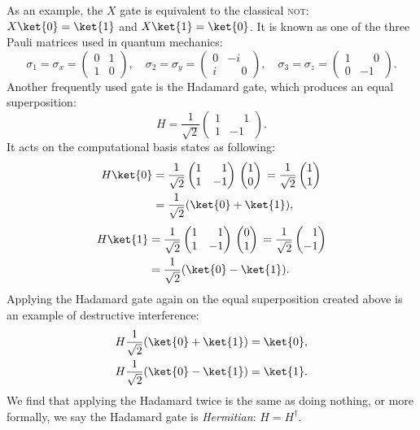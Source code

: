 \documentclass[a4paper,10pt]{article}
\newcommand{\qstatezero}{
	\begin{pmatrix}1 \\ 0\end{pmatrix}
}
\newcommand{\qstateone}{
	\begin{pmatrix}0 \\ 1\end{pmatrix}
}
\newcommand{\hgate}{
	\dfrac{1}{\sqrt2}
	\begin{pmatrix}
		1 & \phantom{-}1 \\
		1 & -1
	\end{pmatrix}
}
\begin{document}
As an example, the $X$ gate is equivalent to the classical \textsc{not}: $X\ket{0} = \ket{1}$ and $X\ket{1} = \ket{0}$.
It is known as one of the three Pauli matrices used in quantum mechanics:
\begin{equation}
\sigma_1 = \sigma_x =
\begin{pmatrix}
0 & 1 \\
1 & 0
\end{pmatrix},
\quad
\sigma_2 = \sigma_y =
\begin{pmatrix}
0 & -i \\
i & \phantom{-}0
\end{pmatrix},
\quad
\sigma_3 = \sigma_z =
\begin{pmatrix}
1 & \phantom{-}0 \\
0 & -1
\end{pmatrix}.
\end{equation}
Another frequently used gate is the Hadamard gate, which produces an equal superposition:
\begin{equation}
H = \hgate{}.
\end{equation}
It acts on the computational basis states as following:
\begin{equation}
\begin{aligned}
H\ket{0} &=
\hgate{}
\qstatezero{}
=
\dfrac{1}{\sqrt2}
\begin{pmatrix}1 \\ 1\end{pmatrix} \\
&= \dfrac{1}{\sqrt2}(\ket{0} + \ket{1}),
\end{aligned}
\end{equation}
\begin{equation}
\begin{aligned}
H\ket{1} &=
\hgate{}
\qstateone{}
=
\dfrac{1}{\sqrt2}
\begin{pmatrix}\phantom{-}1 \\ -1\end{pmatrix} \\
&= \dfrac{1}{\sqrt2}(\ket{0} - \ket{1}).
\end{aligned}
\end{equation}
Applying the Hadamard gate again on the equal superposition created above is an example of destructive interference:
\begin{equation}
\begin{aligned}
H\dfrac{1}{\sqrt2}(\ket{0} + \ket{1}) &= \ket{0}, \\
H\dfrac{1}{\sqrt2}(\ket{0} - \ket{1}) &= \ket{1}.
\end{aligned}
\end{equation}
We find that applying the Hadamard twice is the same as doing nothing, or more formally, we say the Hadamard gate is \emph{Hermitian}: $H = H^\dagger$.
\end{document}
